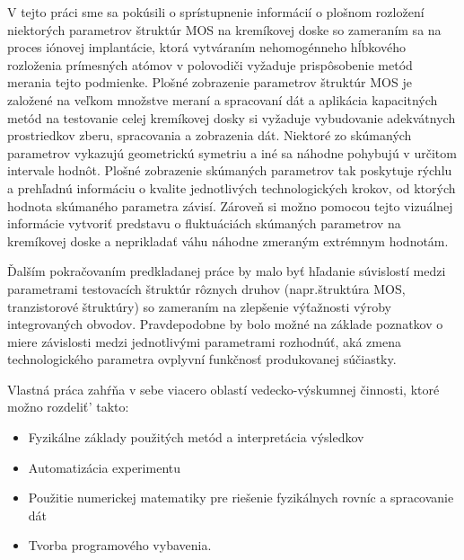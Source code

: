 \par V tejto práci sme sa pokúsili o sprístupnenie informácií o
plošnom rozložení niektorých parametrov štruktúr MOS na kremíkovej
doske so zameraním sa na proces iónovej implantácie, ktorá vytváraním
nehomogénneho hĺbkového rozloženia prímesných atómov v polovodiči
vyžaduje prispôsobenie metód merania tejto podmienke. Plošné
zobrazenie parametrov štruktúr MOS je založené na veľkom množstve
meraní a spracovaní dát a aplikácia kapacitných metód na testovanie
celej kremíkovej dosky si vyžaduje vybudovanie adekvátnych
prostriedkov zberu, spracovania a zobrazenia dát. Niektoré zo
skúmaných parametrov vykazujú geometrickú symetriu a iné sa náhodne
pohybujú v určitom intervale hodnôt. Plošné zobrazenie skúmaných
parametrov tak poskytuje rýchlu a prehľadnú informáciu o kvalite
jednotlivých technologických krokov, od ktorých hodnota skúmaného
parametra závisí. Zároveň si možno pomocou tejto vizuálnej informácie
vytvoriť predstavu o fluktuáciách skúmaných parametrov na kremíkovej
doske a neprikladať váhu náhodne zmeraným extrémnym hodnotám.

\par Ďalším pokračovaním predkladanej práce by malo byť hľadanie
súvislostí medzi parametrami testovacích štruktúr rôznych druhov
(napr.štruktúra MOS, tranzistorové štruktúry) so zameraním na
zlepšenie výťažnosti výroby integrovaných obvodov. Pravdepodobne by
bolo možné na základe poznatkov o miere závislosti medzi jednotlivými
parametrami rozhodnúť, aká zmena technologického parametra ovplyvní
funkčnosť produkovanej súčiastky.

\par Vlastná práca zahŕňa v sebe viacero oblastí vedecko-výskumnej
činnosti, ktoré možno rozdeliť' takto:
\begin{itemize}
\item Fyzikálne základy použitých metód a interpretácia výsledkov
\item Automatizácia experimentu
\item Použitie numerickej  matematiky pre riešenie fyzikálnych rovníc a spracovanie dát
\item Tvorba programového vybavenia.
\end{itemize}

